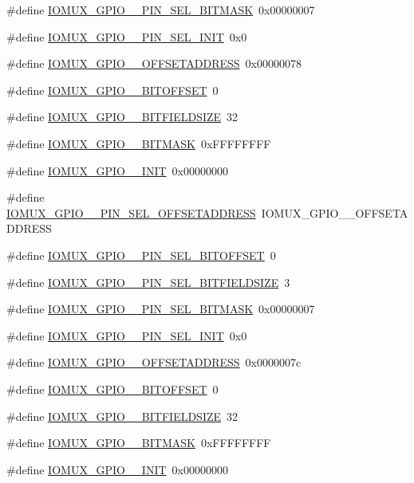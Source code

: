 \begin{DoxyCompactItemize}
\item 
\#define \hyperlink{a00560_a25b80877ac8b1c58a71bf1cc336c3f06}{IOMUX\_\-GPIO\_\_\-PIN\_\-SEL\_\-BITMASK}~0x00000007
\item 
\#define \hyperlink{a00560_a43ae8b556880507fa8bdf0ba659b20e7}{IOMUX\_\-GPIO\_\_\-PIN\_\-SEL\_\-INIT}~0x0
\item 
\#define \hyperlink{a00560_ac6bf70309ad73c86d5e1dd8074bffa06}{IOMUX\_\-GPIO\_\_\-OFFSETADDRESS}~0x00000078
\item 
\#define \hyperlink{a00560_a97c27c0d8094ab69388815748bc0a445}{IOMUX\_\-GPIO\_\_\-BITOFFSET}~0
\item 
\#define \hyperlink{a00560_a7b1ec107533482c8c22f954a74745564}{IOMUX\_\-GPIO\_\_\-BITFIELDSIZE}~32
\item 
\#define \hyperlink{a00560_a15541f6c6063bb26f47b966832cb3bf2}{IOMUX\_\-GPIO\_\_\-BITMASK}~0xFFFFFFFF
\item 
\#define \hyperlink{a00560_a6b8336964a18cd207e5722216d74748a}{IOMUX\_\-GPIO\_\_\-INIT}~0x00000000
\item 
\#define \hyperlink{a00560_af2484f96b55de28f917edf4abe0aabba}{IOMUX\_\-GPIO\_\_\-PIN\_\-SEL\_\-OFFSETADDRESS}~IOMUX\_\-GPIO\_\_\-OFFSETADDRESS
\item 
\#define \hyperlink{a00560_aed6534b3f402878e693e50c6785f5ece}{IOMUX\_\-GPIO\_\_\-PIN\_\-SEL\_\-BITOFFSET}~0
\item 
\#define \hyperlink{a00560_ae673648888c249341a1133f4e3fb0151}{IOMUX\_\-GPIO\_\_\-PIN\_\-SEL\_\-BITFIELDSIZE}~3
\item 
\#define \hyperlink{a00560_ad008c5ec4b072427f804c643e4084618}{IOMUX\_\-GPIO\_\_\-PIN\_\-SEL\_\-BITMASK}~0x00000007
\item 
\#define \hyperlink{a00560_a941efe6e33b53ea0808deea6c2081839}{IOMUX\_\-GPIO\_\_\-PIN\_\-SEL\_\-INIT}~0x0
\item 
\#define \hyperlink{a00560_a83d917b2b7f4b5e9d7e17f1c8dc47623}{IOMUX\_\-GPIO\_\_\-OFFSETADDRESS}~0x0000007c
\item 
\#define \hyperlink{a00560_a8327ec93146e8664fb13f59cd2efbc2a}{IOMUX\_\-GPIO\_\_\-BITOFFSET}~0
\item 
\#define \hyperlink{a00560_a9cc392ba4e7b6331632102bb275502f6}{IOMUX\_\-GPIO\_\_\-BITFIELDSIZE}~32
\item 
\#define \hyperlink{a00560_a9aea771d66d6c872a08f4a2282424064}{IOMUX\_\-GPIO\_\_\-BITMASK}~0xFFFFFFFF
\item 
\#define \hyperlink{a00560_aedcd5a2d66c67ea27e759999a5989bc3}{IOMUX\_\-GPIO\_\_\-INIT}~0x00000000

\end{DoxyCompactItemize}
